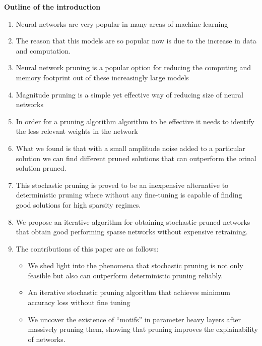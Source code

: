 \vspace{3cm}
\textbf{Outline of the  introduction}

\begin{enumerate}
    \item Neural networks are very popular in many areas of machine learning
    \item The reason that this models are so popular now is due to the increase
        in data and computation.
    \item Neural network pruning is a popular option for reducing the computing
        and memory footprint out of these increasingly large models
    \item Magnitude pruning is a simple yet effective way of reducing size of
        neural networks
    \item In order for a pruning algorithm algorithm to be effective it needs
        to identify the less relevant weights in the network
    \item What we found is that with a small amplitude noise added to a
        particular solution we can find different pruned solutions that can
        outperform the orinal solution pruned.
    \item This stochastic pruning is proved to be an inexpensive alternative
        to deterministic pruning where without any fine-tuning is capable of
        finding good solutions for high sparsity regimes.
    \item We propose an iterative algorithm for obtaining stochastic pruned
        networks that obtain good performing sparse networks without expensive
        retraining.
        

    \item The contributions of this paper are as follows:
     \begin{itemize}
         \item We shed light into the phenomena that stochastic pruning is not
             only feasible but also can outperform deterministic pruning
             reliably.
        \item An iterative stochastic pruning algorithm that achieves minimum
            accuracy loss without fine tuning
        \item We uncover the existence of ``motifs'' in parameter heavy
                layers after massively pruning them, showing that pruning
                improves the explainability of networks.

     \end{itemize}

\end{enumerate}
